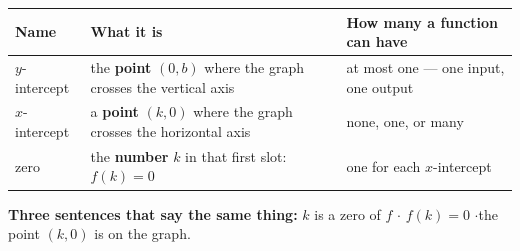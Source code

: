 \documentclass[aspectratio=169, 11pt]{beamer}
\begin{document}
\begin{frame}[t, plain]
  \renewcommand{\arraystretch}{1.3}
  \small
  \begin{tabularx}{\textwidth}{@{}p{2.6cm} p{4.4cm} X@{}}
    \textbf{Name} & \textbf{What it is} & \textbf{How many a function can have} \\
    \hline
    $y$-intercept & the \textbf{point} $(0,b)$ where the graph crosses the vertical axis &
      at most one --- one input, one output \\
    $x$-intercept & a \textbf{point} $(k,0)$ where the graph crosses the horizontal axis &
      none, one, or many \\
    zero & the \textbf{number} $k$ in that first slot: $f(k)=0$ &
      one for each $x$-intercept \\
  \end{tabularx}
  \vspace{0.3cm}

  \textbf{Three sentences that say the same thing:} \quad $k$ is a zero of $f$ \quad$\cdot$\quad
  $f(k)=0$ \quad$\cdot$\quad the point $(k,0)$ is on the graph.
\end{frame}
\end{document}
